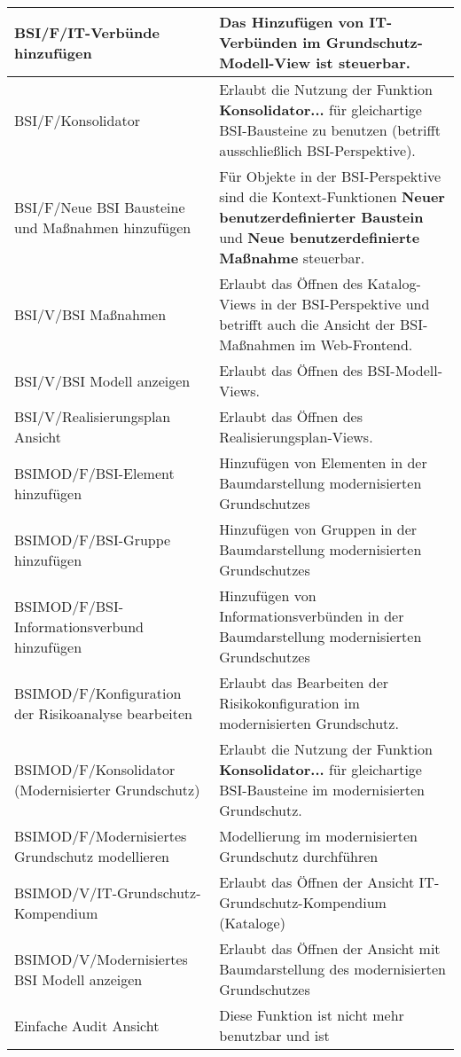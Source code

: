 \documentclass[a4paper,10pt]{book}
\begin{document}
\begin{longtable}{| p{5cm} | p{6cm} |}
BSI/F/IT-Verbünde hinzufügen & Das Hinzufügen von IT-Verbünden im
Grundschutz-Modell-View ist steuerbar. \\[10pt] \hline
BSI/F/Konsolidator & Erlaubt die Nutzung der Funktion \textbf{Konsolidator...}
für gleichartige BSI-Bausteine zu benutzen (betrifft ausschließlich
BSI-Perspektive). \\[10pt] \hline
BSI/F/Neue BSI Bausteine und Maßnahmen hinzufügen & Für Objekte in der
BSI-Perspektive sind die Kontext-Funktionen \textbf{Neuer benutzerdefinierter
Baustein} und \textbf{Neue benutzerdefinierte Maßnahme} steuerbar. \\[10pt]
\hline
BSI/V/BSI Maßnahmen & Erlaubt das Öffnen des Katalog-Views in der
BSI-Perspektive und betrifft auch die Ansicht der BSI-Maßnahmen im
Web-Frontend. \\[10pt] \hline
BSI/V/BSI Modell anzeigen & Erlaubt das Öffnen des BSI-Modell-Views. \\[10pt]
\hline
BSI/V/Realisierungsplan Ansicht & Erlaubt das Öffnen des
Realisierungsplan-Views. \\[10pt] \hline
BSIMOD/F/BSI-Element hinzufügen & Hinzufügen von Elementen in der Baumdarstellung modernisierten Grundschutzes \\[10pt] \hline
BSIMOD/F/BSI-Gruppe hinzufügen & Hinzufügen von Gruppen in der Baumdarstellung modernisierten Grundschutzes \\[10pt] \hline
BSIMOD/F/BSI-Informationsverbund hinzufügen & Hinzufügen von Informationsverbünden in der Baumdarstellung modernisierten Grundschutzes \\[10pt] \hline
BSIMOD/F/Konfiguration der Risikoanalyse bearbeiten & Erlaubt das Bearbeiten der Risikokonfiguration im modernisierten Grundschutz. \\[10pt] \hline
BSIMOD/F/Konsolidator (Modernisierter Grundschutz) & Erlaubt die Nutzung der Funktion \textbf{Konsolidator...} für gleichartige BSI-Bausteine im modernisierten Grundschutz.\\[10pt] \hline
BSIMOD/F/Modernisiertes Grundschutz modellieren & Modellierung im modernisierten Grundschutz durchführen \\[10pt] \hline
BSIMOD/V/IT-Grundschutz-Kompendium & Erlaubt das Öffnen der Ansicht IT-Grundschutz-Kompendium (Kataloge) \\[10pt] \hline
BSIMOD/V/Modernisiertes BSI Modell anzeigen & Erlaubt das Öffnen der Ansicht mit Baumdarstellung des modernisierten Grundschutzes \\[10pt] \hline
Einfache Audit Ansicht & Diese Funktion ist nicht mehr benutzbar und ist

\end{longtable}
\end{document}
